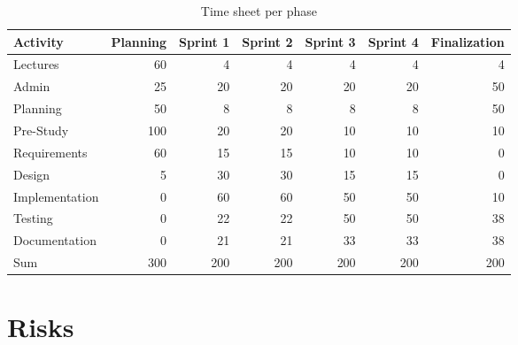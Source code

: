 \documentclass[11pt]{book}
\begin{document}
\begin{table}[H]
\centering
\begin{tabular}{ l | r r r r r r }
    Activity                & Planning  & Sprint 1  & Sprint 2  & Sprint 3  & Sprint 4  & Finalization    \\ \hline        
    Lectures                & 60        & 4         & 4         & 4         & 4         & 4               \\ \hline
    Admin                   & 25        & 20        & 20        & 20        & 20        & 50              \\ \hline
    Planning                & 50        & 8         & 8         & 8         & 8         & 50              \\ \hline
    Pre-Study               & 100       & 20        & 20        & 10        & 10        & 10              \\ \hline
    Requirements            & 60        & 15        & 15        & 10        & 10        & 0               \\ \hline
    Design                  & 5         & 30        & 30        & 15        & 15        & 0               \\ \hline
    Implementation          & 0         & 60        & 60        & 50        & 50        & 10              \\ \hline
    Testing                 & 0         & 22        & 22        & 50        & 50        & 38              \\ \hline
    Documentation           & 0         & 21        & 21        & 33        & 33        & 38              \\ \hline
    Sum                     & 300       & 200       & 200       & 200       & 200       & 200
\end{tabular}
\caption{Time sheet per phase}
\label{tab:plan_time_per_phase}
\end{table}

\section{Risks}\label{sec:project_risk_assessment}
\end{document}
